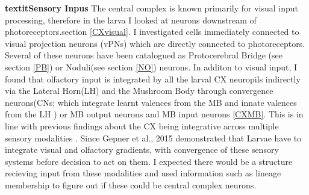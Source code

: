      \textbf{ textit{Sensory Inpus} }
    The central complex is known primarily for visual input processing, therefore in the larva I looked at neurons downstream of photoreceptors.section \ref{CXvisual}. I investigated cells immediately connected to visual projection neurons (vPNs) which are directly connected to photoreceptors. Several of these neurons have been catalogued as Protocerebral Bridge (see section \ref{PB}) or Noduli(see section \ref{NO}) neurons. 
    In additon to visual input, I found that olfactory input is integrated by all the larval CX neuropils indirectly via the Lateral Horn(LH) and the Mushroom Body through convergence neurons(CNs; which integrate learnt valences from the MB and innate valences from the LH \citep{eschbach2021circuits}) or MB output neurons and MB input neurons \ref{CXMB}. This is in line with previous findings about the CX being integrative across multiple sensory modalities \citep{hulse2021connectome}. Since Gepner et al., 2015 demonstrated that Larvae  have to integrate visual and olfactory gradients, with convergence of these sensory systems before decision to act on them. I expected there would be a structure recieving input from these modalities and used information such as lineage membership to figure out if these could be central complex neurons. 

